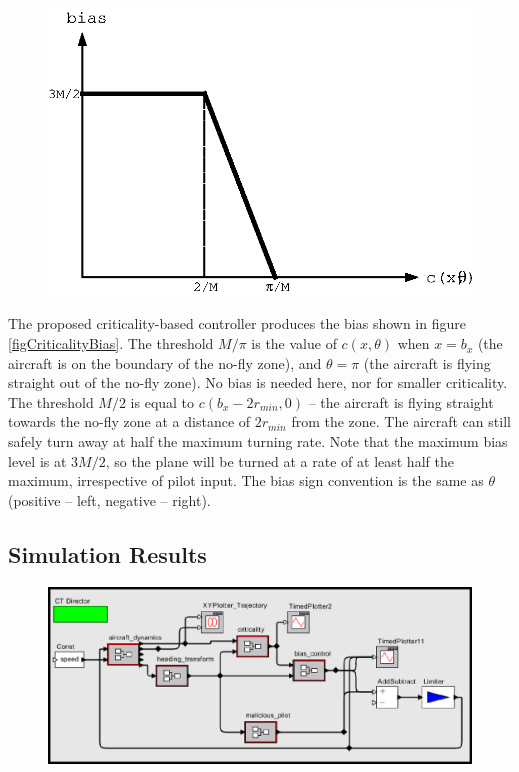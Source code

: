 \documentclass[11pt]{article}
\begin{document}
\begin{figure}[btp]
\centering
\includegraphics{criticalityBias.eps}
\end{figure}

The proposed criticality-based controller produces the bias shown in
figure \ref{figCriticalityBias}.  The threshold $M/\pi$ is the value
of $c(x, \theta)$ when $x = b_{x}$ (the aircraft is on the boundary of
the no-fly zone), and $\theta = \pi$ (the aircraft is flying straight
out of the no-fly zone). No bias is needed here, nor for smaller
criticality.  The threshold $M/2$ is equal to $c(b_{x}-2r_{min}, 0)$
-- the aircraft is flying straight towards the no-fly zone at a
distance of $2r_{min}$ from the zone.  The aircraft can still safely
turn away at half the maximum turning rate. Note that the maximum bias
level is at $3M/2$, so the plane will be turned at a rate of at least
half the maximum, irrespective of pilot input. The bias sign convention
is the same as $\theta$ (positive -- left, negative -- right).


\subsection{Simulation Results}

\begin{figure}[btp]
\centering
\includegraphics[width=5in]{criticalityTopLevel.eps}
\end{figure}
\end{document}
